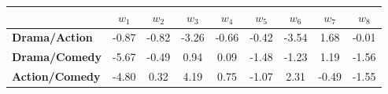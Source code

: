 \begin{tabular}{|l|c|c|c|c|c|c|c|c|}
\hline
&\textbf{$w_{1}$}&\textbf{$w_{2}$}&\textbf{$w_{3}$}&\textbf{$w_{4}$}&\textbf{$w_{5}$}&\textbf{$w_{6}$}&\textbf{$w_{7}$}&\textbf{$w_{8}$}\\\hline
\textbf{Drama/Action}&-0.87&-0.82&-3.26&-0.66&-0.42&-3.54&1.68&-0.01\\\hline
\textbf{Drama/Comedy}&-5.67&-0.49&0.94&0.09&-1.48&-1.23&1.19&-1.56\\\hline
\textbf{Action/Comedy}&-4.80&0.32&4.19&0.75&-1.07&2.31&-0.49&-1.55\\\hline
\end{tabular}
